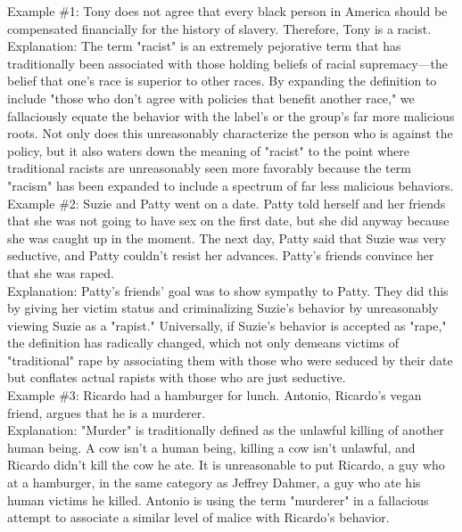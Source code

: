\documentclass[a4paper,12pt,single,pdftex]{scrartcl}
\begin{document}
    
      Example \#1: Tony does not agree that every black person in America should be compensated financially for the history of slavery. Therefore, Tony is a racist.
    \\

    
      Explanation: The term "racist" is an extremely pejorative term that has traditionally been associated with those holding beliefs of racial supremacy—the belief that one's race is superior to other races. By expanding the definition to include "those who don't agree with policies that benefit another race," we fallaciously equate the behavior with the label's or the group's far more malicious roots. Not only does this unreasonably characterize the person who is against the policy, but it also waters down the meaning of "racist" to the point where traditional racists are unreasonably seen more favorably because the term "racism" has been expanded to include a spectrum of far less malicious behaviors.
    \\

    
      Example \#2: Suzie and Patty went on a date. Patty told herself and her friends that she was not going to have sex on the first date, but she did anyway because she was caught up in the moment. The next day, Patty said that Suzie was very seductive, and Patty couldn't resist her advances. Patty's friends convince her that she was raped.
    \\

    
      Explanation: Patty's friends' goal was to show sympathy to Patty. They did this by giving her victim status and criminalizing Suzie's behavior by unreasonably viewing Suzie as a "rapist." Universally, if Suzie's behavior is accepted as "rape," the definition has radically changed, which not only demeans victims of "traditional" rape by associating them with those who were seduced by their date but conflates actual rapists with those who are just seductive.
    \\

    
      Example \#3: Ricardo had a hamburger for lunch. Antonio, Ricardo's vegan friend, argues that he is a murderer.
    \\

    
      Explanation: "Murder" is traditionally defined as the unlawful killing of another human being. A cow isn't a human being, killing a cow isn't unlawful, and Ricardo didn't kill the cow he ate. It is unreasonable to put Ricardo, a guy who at a hamburger, in the same category as Jeffrey Dahmer, a guy who ate his human victims he killed. Antonio is using the term "murderer" in a fallacious attempt to associate a similar level of malice with Ricardo's behavior.
    \\
\end{document}
